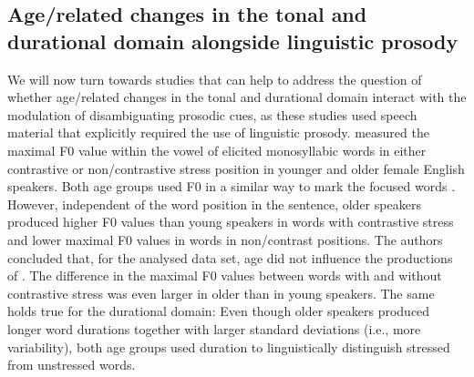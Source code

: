 \documentclass[output=paper]{langscibook}
\begin{document}
\subsection{Age\-/related changes in the tonal and durational domain alongside linguistic prosody}\label{age_lp}
\begin{sloppypar}
We will now turn towards studies that can help to address the question of whether age\-/related changes in the tonal and durational domain interact with the modulation of disambiguating prosodic cues, as these studies used speech material that explicitly required the use of linguistic prosody. \citet{scukanec_etal1996} measured the maximal F0 value within the vowel of elicited monosyllabic words in either contrastive or non\-/contrastive stress position in younger and older female English speakers. Both age groups used F0 in a similar way to mark the focused words \citep[235]{scukanec_etal1996}. However, independent of the word position in the sentence, older speakers produced higher F0 values than young speakers in words with contrastive stress and lower maximal F0 values in words in non\-/contrast positions. The authors concluded that, for the analysed data set, age did not influence the productions of  \citep[238]{scukanec_etal1996}. The difference in the maximal F0 values between words with and without contrastive stress was even larger in older than in young speakers. The same holds true for the durational domain: Even though older speakers produced longer word durations together with larger standard deviations (i.e., more variability), both age groups used duration to linguistically distinguish stressed from unstressed words.
\end{sloppypar}
\end{document}
